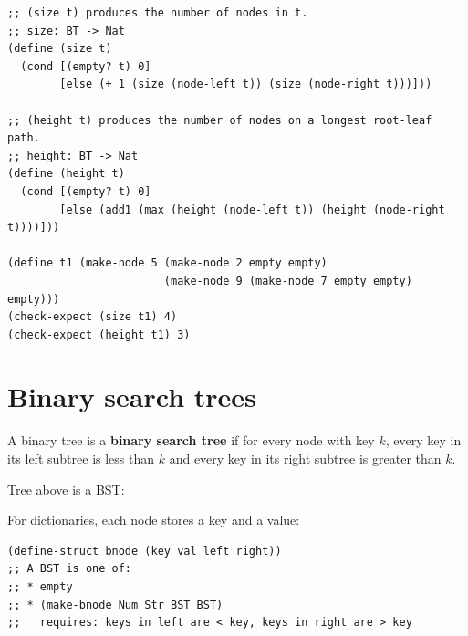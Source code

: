 \begin{lstlisting}[style=racket]
;; (size t) produces the number of nodes in t.
;; size: BT -> Nat
(define (size t)
  (cond [(empty? t) 0]
        [else (+ 1 (size (node-left t)) (size (node-right t)))]))

;; (height t) produces the number of nodes on a longest root-leaf path.
;; height: BT -> Nat
(define (height t)
  (cond [(empty? t) 0]
        [else (add1 (max (height (node-left t)) (height (node-right t))))]))

(define t1 (make-node 5 (make-node 2 empty empty)
                        (make-node 9 (make-node 7 empty empty) empty)))
(check-expect (size t1) 4)
(check-expect (height t1) 3)
\end{lstlisting}

\section{Binary search trees}

\begin{definition}
A binary tree is a \textbf{binary search tree} if for every node with key $k$,
every key in its left subtree is less than $k$ and every key in its right
subtree is greater than $k$.
\end{definition}

Tree  above is a BST:
\begin{center}
\end{center}

For dictionaries, each node stores a key and a value:
\begin{lstlisting}[style=racket]
(define-struct bnode (key val left right))
;; A BST is one of:
;; * empty
;; * (make-bnode Num Str BST BST)
;;   requires: keys in left are < key, keys in right are > key
\end{lstlisting}

